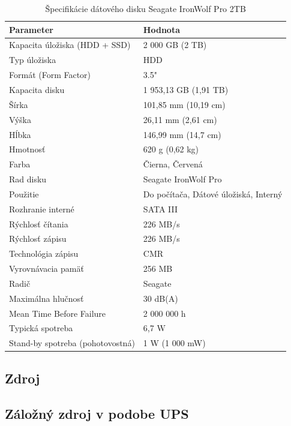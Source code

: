 \documentclass[12pt,oneside,slovak,a4paper]{article}
\begin{document}
\begin{table}[h]
\centering
\begin{tabularx}{\textwidth}{|l|X|}
\hline
\textbf{Parameter} & \textbf{Hodnota} \\ \hline
Kapacita úložiska (HDD + SSD) & 2 000 GB (2 TB) \\ \hline
Typ úložiska & HDD \\ \hline
Formát (Form Factor) & 3.5" \\ \hline
Kapacita disku & 1 953,13 GB (1,91 TB) \\ \hline
Šírka & 101,85 mm (10,19 cm) \\ \hline
Výška & 26,11 mm (2,61 cm) \\ \hline
Hĺbka & 146,99 mm (14,7 cm) \\ \hline
Hmotnosť & 620 g (0,62 kg) \\ \hline
Farba & Čierna, Červená \\ \hline
Rad disku & Seagate IronWolf Pro \\ \hline
Použitie & Do počítača, Dátové úložiská, Interný \\ \hline
Rozhranie interné & SATA III \\ \hline
Rýchlosť čítania & 226 MB/s \\ \hline
Rýchlosť zápisu & 226 MB/s \\ \hline
Technológia zápisu & CMR \\ \hline
Vyrovnávacia pamäť & 256 MB \\ \hline
Radič & Seagate \\ \hline
Maximálna hlučnosť & 30 dB(A) \\ \hline
Mean Time Before Failure & 2 000 000 h \\ \hline
Typická spotreba & 6,7 W \\ \hline
Stand-by spotreba (pohotovostná) & 1 W (1 000 mW) \\ \hline
\end{tabularx}
\caption{Špecifikácie dátového disku Seagate IronWolf Pro 2TB}
\end{table}


\subsection{Zdroj}

\subsection{Záložný zdroj v podobe UPS}
\end{document}
